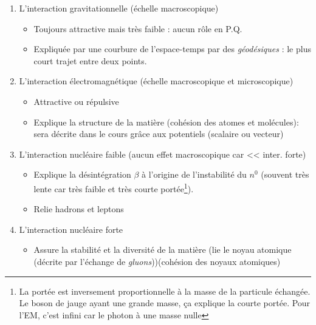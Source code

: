 \documentclass[british,french,11pt, a4paper, openany]{book}
\begin{document}
	\begin{enumerate}
		\item L'interaction gravitationnelle (échelle macroscopique)
		\begin{itemize}
			\item Toujours attractive mais très faible : aucun rôle en P.Q.
			\item Expliquée par une courbure de l'espace-temps par des \textit{géodésiques} : le plus court trajet entre deux points.
		\end{itemize}
		\item L'interaction électromagnétique (échelle macroscopique et microscopique)
		\begin{itemize}
			\item Attractive ou répulsive
			\item Explique la structure de la matière (cohésion des atomes et molécules): sera décrite dans le cours grâce aux potentiels (scalaire ou vecteur)
		\end{itemize}
		\item L'interaction nucléaire faible (aucun effet macroscopique car << inter. forte)
		\begin{itemize}
			\item Explique la désintégration $\beta$ à l'origine de l'instabilité du $n^0$ (souvent très lente car très faible et très courte portée\footnote{La portée est inversement proportionnelle à la masse de la particule échangée. Le boson de jauge ayant une grande masse, ça explique la courte portée. Pour l'EM, c'est infini car le photon à une masse nulle}).
			\item Relie hadrons et leptons
		\end{itemize}
		\item L'interaction nucléaire forte
		\begin{itemize}
			
			\item Assure la stabilité et la diversité de la matière (lie le noyau atomique (décrite par l'échange de \textit{gluons}))(cohésion des noyaux atomiques)
		\end{itemize}
	\end{enumerate}
	
\end{document}
